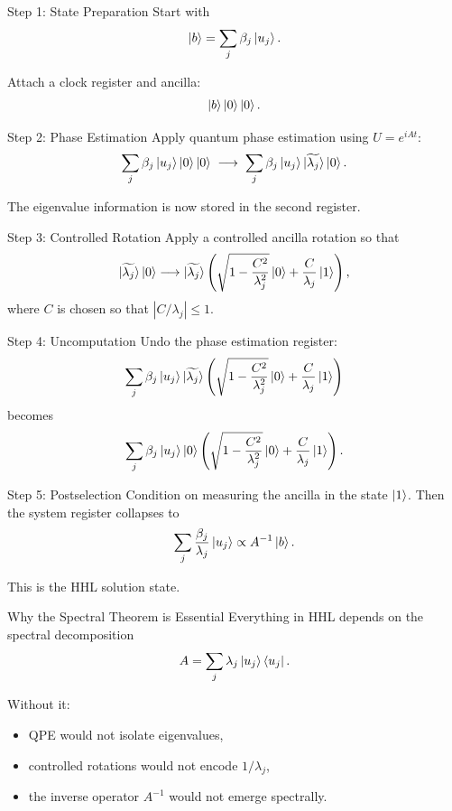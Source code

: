 \documentclass{beamer}
\begin{document}
\begin{frame}{Step 1: State Preparation}
Start with
\[
\ket{b}=\sum_j \beta_j \ket{u_j}.
\]

Attach a clock register and ancilla:
\[
\ket{b}\ket{0}\ket{0}.
\]
\end{frame}

\begin{frame}{Step 2: Phase Estimation}
Apply quantum phase estimation using \(U=e^{iAt}\):
\[
\sum_j \beta_j \ket{u_j}\ket{0}\ket{0}
\;\longrightarrow\;
\sum_j \beta_j \ket{u_j}\ket{\widetilde{\lambda_j}}\ket{0}.
\]

The eigenvalue information is now stored in the second register.
\end{frame}

\begin{frame}{Step 3: Controlled Rotation}
Apply a controlled ancilla rotation so that
\[
\ket{\widetilde{\lambda_j}}\ket{0}
\longrightarrow
\ket{\widetilde{\lambda_j}}
\left(
\sqrt{1-\frac{C^2}{\lambda_j^2}}\ket{0}
+
\frac{C}{\lambda_j}\ket{1}
\right),
\]
where \(C\) is chosen so that \(|C/\lambda_j|\le 1\).
\end{frame}

\begin{frame}{Step 4: Uncomputation}
Undo the phase estimation register:
\[
\sum_j \beta_j \ket{u_j}\ket{\widetilde{\lambda_j}}
\left(
\sqrt{1-\frac{C^2}{\lambda_j^2}}\ket{0}
+
\frac{C}{\lambda_j}\ket{1}
\right)
\]
becomes
\[
\sum_j \beta_j \ket{u_j}\ket{0}
\left(
\sqrt{1-\frac{C^2}{\lambda_j^2}}\ket{0}
+
\frac{C}{\lambda_j}\ket{1}
\right).
\]
\end{frame}

\begin{frame}{Step 5: Postselection}
Condition on measuring the ancilla in the state \(\ket{1}\). Then the system register collapses to
\[
\sum_j \frac{\beta_j}{\lambda_j}\ket{u_j}
\propto A^{-1}\ket{b}.
\]

This is the HHL solution state.
\end{frame}

\begin{frame}{Why the Spectral Theorem is Essential}
Everything in HHL depends on the spectral decomposition
\[
A=\sum_j \lambda_j \ket{u_j}\bra{u_j}.
\]

Without it:
\begin{itemize}
\item QPE would not isolate eigenvalues,
\item controlled rotations would not encode \(1/\lambda_j\),
\item the inverse operator \(A^{-1}\) would not emerge spectrally.
\end{itemize}
\end{frame}
\end{document}
